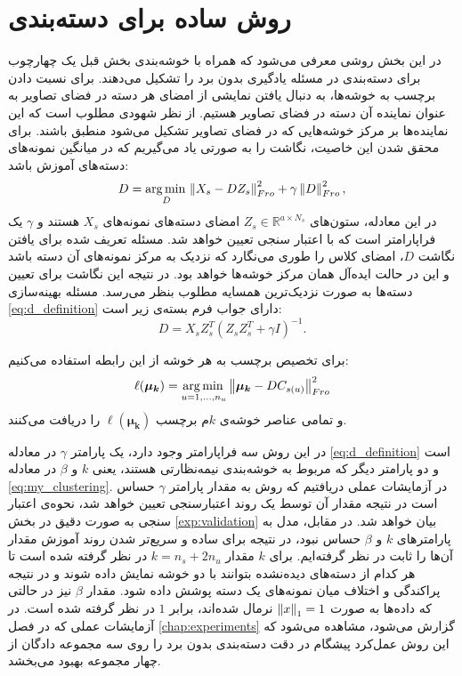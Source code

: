\section{روش ساده برای دسته‌بندی} \label{simple_method}
در این بخش روشی معرفی می‌شود که همراه با خوشه‌بندی بخش قبل یک چهارچوب برای دسته‌بندی در مسئله یادگیری بدون برد را تشکیل می‌دهند. برای نسبت دادن برچسب به خوشه‌ها، به دنبال یافتن نمایشی از امضای هر دسته در فضای تصاویر به عنوان نماینده آن دسته در فضای تصاویر هستیم. از نظر شهودی مطلوب است که این نماینده‌ها بر مرکز خوشه‌هایی که در فضای تصاویر تشکیل می‌شود منطبق باشند. برای محقق شدن این خاصیت، نگاشت را به صورتی یاد می‌گیریم که در میانگین نمونه‌های دسته‌های آموزش باشد:
\begin{equation} \label{eq:d_definition}
  D = \operatorname*{arg\,min\,}_D \left \lVert X_s - D Z_s \right \rVert_{Fro}^2 + \gamma \left \lVert D \right \rVert_{Fro}^2,
\end{equation}
در این معادله، ستون‌های
 $Z_s \in \mathbb{R}^{a \times N_s}$
  امضای دسته‌های نمونه‌های $X_s$ هستند و $\gamma$ یک فراپارامتر است که با اعتبار سنجی تعیین خواهد شد. مسئله تعریف شده برای یافتن نگاشت $D$، امضای کلاس را طوری می‌نگارد که نزدیک به مرکز نمونه‌های آن دسته باشد و این در حالت ایده‌آل همان مرکز خوشه‌ها خواهد بود. در نتیجه این نگاشت برای تعیین دسته‌ها به صورت نزدیک‌ترین همسایه مطلوب بنظر می‌رسد. مسئله بهینه‌سازی
  \eqref{eq:d_definition}
  دارای جواب فرم بسته‌ی زیر است:
  \begin{equation} \label{eq:d_answer}
  D = X_s Z_s^T (Z_s Z_s^T + \gamma I)^{-1}.
\end{equation}

برای تخصیص برچسب به هر خوشه از این رابطه استفاده می‌کنیم:
\begin{equation}
\label{eq:simple_assignment}
\ell(\boldsymbol{\mu_k}) = \operatorname*{arg\,min\,}_{u=1,\ldots,n_u} \left \lVert \boldsymbol{\mu_k} - DC_{s(u)} \right \rVert_{Fro}^2
\end{equation}
و تمامی عناصر خوشه‌ی $k$م برچسب $\ell(\boldsymbol{\mu_k})$ را دریافت می‌کنند.

در این روش سه فراپارامتر وجود دارد، یک پارامتر $\gamma$ در معادله
\eqref{eq:d_definition}
است و دو پارامتر دیگر که مربوط به خوشه‌بندی نیمه‌نظارتی هستند، یعنی $k$ و $\beta$ در معادله
\eqref{eq:my_clustering}.
در آزمایشات عملی دریافتیم که روش به مقدار پارامتر $\gamma$ حساس است در نتیجه مقدار آن توسط یک روند اعتبارسنجی تعیین خواهد شد، نحوه‌ی اعتبار سنجی به صورت دقیق در بخش
\ref{exp:validation}
بیان خواهد شد. در مقابل، مدل به پارامترهای $k$ و $\beta$ حساس نبود، در نتیجه برای ساده و سریع‌تر شدن روند آموزش مقدار آن‌ها را ثابت در نظر گرفته‌ایم. برای $k$ مقدار
$k = n_s + 2n_u$
در نظر گرفته شده است تا هر کدام از دسته‌های دیده‌نشده بتوانند با دو خوشه نمایش داده شوند و در نتیجه پراکندگی و اختلاف میان نمونه‌های یک دسته پوشش داده شود. مقدار $\beta$ نیز در حالتی که داده‌ها به صورت $\left \lVert x \right \rVert_1=1$ نرمال شده‌اند، برابر $1$ در نظر گرفته شده است.
در آزمایشات عملی که در فصل
\ref{chap:experiments}
گزارش می‌شود، مشاهده می‌شود که این روش  عمل‌کرد پیشگام در دقت دسته‌بندی بدون برد را روی سه مجموعه دادگان از چهار مجموعه بهبود می‌بخشد.

